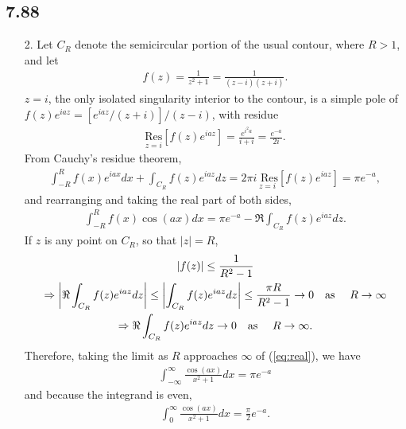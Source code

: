 \documentclass[a4paper,12pt]{article}
\begin{document}
\subsection*{7.88}
\begin{enumerate}
    \item[2.]
        Let $C_R$ denote the semicircular portion of the usual contour, where $R > 1$, and let
        \begin{align*}
            f(z) = \frac{1}{z^2 + 1} = \frac{1}{(z - i)(z + i)}.
        \end{align*}
        $z = i$, the only isolated singularity interior to the contour, is a simple pole of $f(z) e^{iaz} = [e^{iaz} / (z + i)] / (z - i)$, with residue
        \begin{align*}
            \underset{z = i}{\text{Res}} \left[ f(z) e^{iaz} \right] = \frac{e^{i^2 a}}{i + i} = \frac{e^{-a}}{2i}.
        \end{align*}
        From Cauchy's residue theorem,
        \begin{align*}
            \int_{-R}^R f(x) e^{iax} dx + \int_{C_R} f(z) e^{iaz} dz = 2\pi i \underset{z = i}{\text{ Res}} \left[ f(z) e^{iaz} \right] = \pi e^{-a},
        \end{align*}
        and rearranging and taking the real part of both sides,
        \begin{align}
            \int_{-R}^R f(x) \cos(ax) dx = \pi e^{-a} - \Re \int_{C_R} f(z) e^{iaz} dz. \label{eq:real}
        \end{align}
        If $z$ is any point on $C_R$, so that $|z| = R$,
        \begin{gather*}
            |f(z)| \leq \frac{1}{R^2 - 1} \\
            \Rightarrow \left| \Re \int_{C_R} f(z) e^{iaz} dz \right| \leq \left| \int_{C_R} f(z) e^{iaz} dz \right| \leq \frac{\pi R}{R^2 - 1} \to 0 \text{\quad as \quad} R \to \infty \\
            \Rightarrow \Re \int_{C_R} f(z) e^{iaz} dz \to 0 \text{\quad as \quad} R \to \infty.
        \end{gather*}
        Therefore, taking the limit as $R$ approaches $\infty$ of (\ref{eq:real}), we have
        \begin{align*}
            \int_{-\infty}^\infty \frac{\cos(ax)}{x^2 + 1} dx = \pi e^{-a}
        \end{align*}
        and because the integrand is even,
        \begin{align*}
            \int_0^\infty \frac{\cos(ax)}{x^2 + 1} dx = \frac{\pi}{2} e^{-a}.
        \end{align*}


\end{enumerate}
\end{document}
